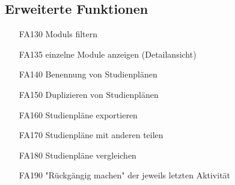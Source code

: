 	\subsection{Erweiterte Funktionen}
		\begin{itemize}[nosep]
		\item [FA130] \glspl{Modul} filtern
		\item[FA135] einzelne Module anzeigen (Detailansicht)
		\item [FA140]	Benennung von Studienplänen
		\item [FA150] Duplizieren von Studienplänen
		\item [FA160] Studienpläne exportieren
		\item [FA170] Studienpläne mit anderen teilen
		\item[FA180] Studienpläne vergleichen
		\item [FA190] "Rückgängig machen" der jeweils letzten Aktivität
		\end{itemize}

